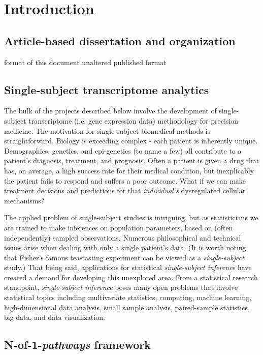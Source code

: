 \chapter{Introduction}\label{Chap:Intro}

\section{Article-based dissertation and organization}\label{sec:org}

format of this document
unaltered published format

\section{Single-subject transcriptome analytics}\label{sec:nof1}

\indent \indent The bulk of the projects described below involve the development of single-subject transcriptome (i.e. gene expression data) methodology for precision medicine. The motivation for single-subject biomedical methods is straightforward. Biology is exceeding complex - each patient is inherently unique. Demographics, genetics, and epi-genetics (to name a few) all contribute to a patient's diagnosis, treatment, and prognosis. Often a patient is given a drug that has, on average, a high success rate for their medical condition, but inexplicably the patient fails to respond and suffers a poor outcome. What if we can make treatment decisions and predictions for that \emph{individual's} dysregulated cellular mechanisms? 

The applied problem of single-subject studies is intriguing, but as statisticians we are trained to make inferences on population parameters, based on (often independently) sampled observations. Numerous philosophical and technical issues arise when dealing with only a single patient's data. (It is worth noting that Fisher's famous tea-tasting experiment can be viewed as a \emph{single-subject} study.) That being said, applications for statistical \emph{single-subject inference} have created a demand for developing this unexplored area. From a statistical research standpoint, \emph{single-subject inference} poses many open problems that involve statistical topics including multivariate statistics, computing, machine learning, high-dimensional data analysis, small sample analysis, paired-sample statistics, big data, and data visualization.

\section{N-of-1-\emph{pathways} framework}\label{sec:nof1pathways}

